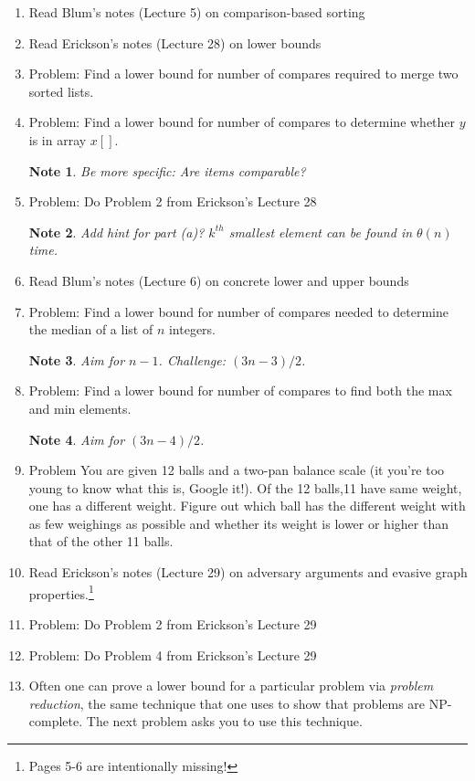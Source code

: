 \documentclass[11pt]{article}
\newtheorem{note}{Note}
\begin{document}
\begin{enumerate}
\item Read Blum's notes (Lecture 5) on comparison-based sorting
\item Read Erickson's notes (Lecture 28) on lower bounds
\item Problem: Find a lower bound for number of compares required to merge two sorted lists.
\item Problem: Find a lower bound for number of compares to determine whether $y$ is in array $x[]$.
\begin{note} Be more specific: Are items comparable?\end{note}
\item Problem: Do Problem 2 from Erickson's Lecture 28
\begin{note} Add hint for part (a)? $k^{th}$ smallest element can be found in $\theta(n)$ time.\end{note}
\item Read Blum's notes (Lecture 6) on concrete lower and upper bounds
\item Problem: Find a lower bound for number of compares needed to determine the median of a list of $n$ integers.
\begin{note} Aim for $n-1$. Challenge: $(3n-3)/2$. \end{note}
\item Problem: Find a lower bound for number of compares to find both the max and min elements.
\begin{note} Aim for $(3n-4)/2$. \end{note}
\item Problem You are given 12 balls and a two-pan balance scale (it you're too young to know what this is, Google it!).
Of the 12 balls,11 have same weight, one has a different weight. Figure out which ball has the different weight with as few weighings as possible and whether its weight is lower or higher than that of the other 11 balls.
\item Read Erickson's notes (Lecture 29) on adversary arguments and evasive graph properties.\footnote{Pages 5-6 are intentionally missing!}
\item Problem: Do Problem 2 from Erickson's Lecture 29
\item Problem: Do Problem 4 from Erickson's Lecture 29
\item Often one can prove a lower bound for a particular problem via {\em problem reduction}, the same technique
that one uses to show that problems are NP-complete.  The next problem asks you to use this technique.

\end{enumerate}
\end{document}
